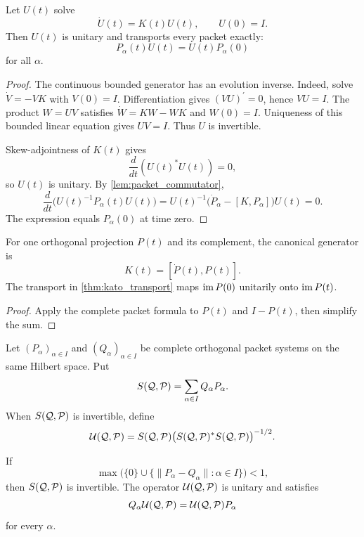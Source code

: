 \begin{theorem}\label{thm:kato_transport}
Let $U(t)$ solve
\[
\dot U(t)=K(t)U(t),
\qquad
U(0)=I.
\]
Then $U(t)$ is unitary and transports every packet exactly:
\[
P_\alpha(t)U(t)=U(t)P_\alpha(0)
\]
for all $\alpha$.
\end{theorem}

\begin{proof}
The continuous bounded generator has an evolution inverse. Indeed, solve $\dot V=-VK$ with $V(0)=I$. Differentiation gives $(VU)^{\prime}=0$, hence $VU=I$. The product $W=UV$ satisfies $\dot W=KW-WK$ and $W(0)=I$. Uniqueness of this bounded linear equation gives $UV=I$. Thus $U$ is invertible.

Skew-adjointness of $K(t)$ gives
\[
\frac{d}{dt}(U(t)^*U(t))=0,
\]
so $U(t)$ is unitary.  By \cref{lem:packet_commutator},
\[
\frac{d}{dt}\big(U(t)^{-1}P_\alpha(t)U(t)\big)
=
U(t)^{-1}\big(\dot P_\alpha-[K,P_\alpha]\big)U(t)
=0.
\]
The expression equals $P_\alpha(0)$ at time zero.
\end{proof}

\begin{corollary}\label{cor:one_moving_subspace}
For one orthogonal projection $P(t)$ and its complement, the canonical generator is
\[
K(t)=[\dot P(t),P(t)].
\]
The transport in \cref{thm:kato_transport} maps $\operatorname{im} P(0)$ unitarily onto $\operatorname{im} P(t)$.
\end{corollary}

\begin{proof}
Apply the complete packet formula to $P(t)$ and $I-P(t)$, then simplify the sum.
\end{proof}


\begin{definition}\label{def:packet_direct_rotation}
Let $(P_\alpha)_{\alpha\in I}$ and $(Q_\alpha)_{\alpha\in I}$ be complete orthogonal packet systems on the same Hilbert space.  Put
\[
S(\mathcal Q,\mathcal P)=\sum_{\alpha\in I}Q_\alpha P_\alpha.
\]
When $S(\mathcal Q,\mathcal P)$ is invertible, define
\[
\mathcal U(\mathcal Q,\mathcal P)
=
S(\mathcal Q,\mathcal P)
\big(S(\mathcal Q,\mathcal P)^*S(\mathcal Q,\mathcal P)\big)^{-1/2}.
\]
\end{definition}

\begin{proposition}\label{prop:packet_direct_rotation}
If
\[
\max\bigl(\{0\}\cup\{\|P_\alpha-Q_\alpha\|:\alpha\in I\}\bigr)<1,
\]
then $S(\mathcal Q,\mathcal P)$ is invertible.  The operator $\mathcal U(\mathcal Q,\mathcal P)$ is unitary and satisfies
\[
Q_\alpha\mathcal U(\mathcal Q,\mathcal P)
=
\mathcal U(\mathcal Q,\mathcal P)P_\alpha
\]
for every $\alpha$.
\end{proposition}

